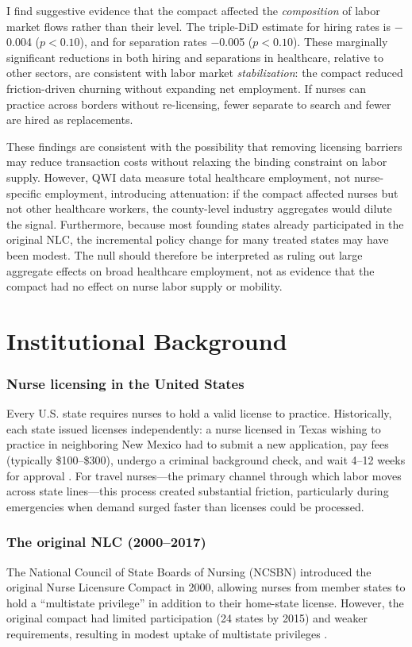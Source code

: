 \documentclass[12pt]{article}
\begin{document}
I find suggestive evidence that the compact affected the \emph{composition} of labor market flows rather than their level. The triple-DiD estimate for hiring rates is $-$0.004 ($p < 0.10$), and for separation rates $-$0.005 ($p < 0.10$). These marginally significant reductions in both hiring and separations in healthcare, relative to other sectors, are consistent with labor market \emph{stabilization}: the compact reduced friction-driven churning without expanding net employment. If nurses can practice across borders without re-licensing, fewer separate to search and fewer are hired as replacements.

These findings are consistent with the possibility that removing licensing barriers may reduce transaction costs without relaxing the binding constraint on labor supply. However, QWI data measure total healthcare employment, not nurse-specific employment, introducing attenuation: if the compact affected nurses but not other healthcare workers, the county-level industry aggregates would dilute the signal. Furthermore, because most founding states already participated in the original NLC, the incremental policy change for many treated states may have been modest. The null should therefore be interpreted as ruling out large aggregate effects on broad healthcare employment, not as evidence that the compact had no effect on nurse labor supply or mobility.


\section{Institutional Background}

\subsubsection*{Nurse licensing in the United States} Every U.S. state requires nurses to hold a valid license to practice. Historically, each state issued licenses independently: a nurse licensed in Texas wishing to practice in neighboring New Mexico had to submit a new application, pay fees (typically \$100--\$300), undergo a criminal background check, and wait 4--12 weeks for approval \citep{ncsbn2018enlc}. For travel nurses---the primary channel through which labor moves across state lines---this process created substantial friction, particularly during emergencies when demand surged faster than licenses could be processed.

\subsubsection*{The original NLC (2000--2017)} The National Council of State Boards of Nursing (NCSBN) introduced the original Nurse Licensure Compact in 2000, allowing nurses from member states to hold a ``multistate privilege'' in addition to their home-state license. However, the original compact had limited participation (24 states by 2015) and weaker requirements, resulting in modest uptake of multistate privileges \citep{depasquale2016nbc}.
\end{document}
